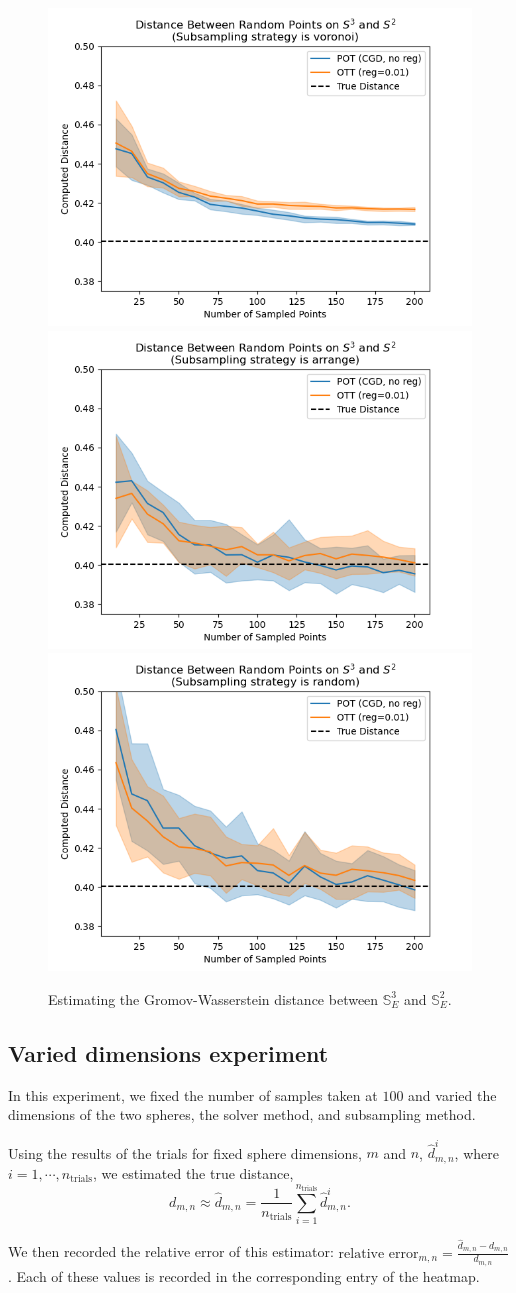 \documentclass{article}
\begin{document}
\begin{figure}[ht]
    \centering
    \includegraphics[width=0.3\linewidth]{../plots_same_axis/voronoi_trials/n_20_d_3_d2.png}
    \includegraphics[width=0.3\linewidth]{../plots_same_axis/arrange_trials/n_20_d_3_d2.png}
    \includegraphics[width=0.3\linewidth]{../plots_same_axis/random_trials/n_20_d_3_d2.png}
    \caption{Estimating the Gromov-Wasserstein distance between $\mathbb{S}^3_E$ and $\mathbb{S}^2_E$.}
\end{figure}

\subsection{Varied dimensions experiment}
In this experiment, we fixed the number of samples taken at $100$ and varied
the dimensions of the two spheres, the solver method, and subsampling method.

Using the results of the trials for fixed sphere dimensions, $m$ and $n$,
$\hat{d}^i_{m, n}$, where $i = 1, \cdots, n_\textrm{trials}$, we estimated the
true distance,
\[ d_{m, n} \approx \hat{d}_{m, n} =
    \frac{1}{n_\textrm{trials}}\sum_{i=1}^{n_\textrm{trials}} \hat{d}^i_{m, n}.
\]

We then recorded the relative error of this estimator: $\textrm{relative
error}_{m, n} = \frac{\hat{d}_{m, n} - d_{m, n}}{d_{m, n}}$. Each of these
values is recorded in the corresponding entry of the heatmap.
\end{document}
